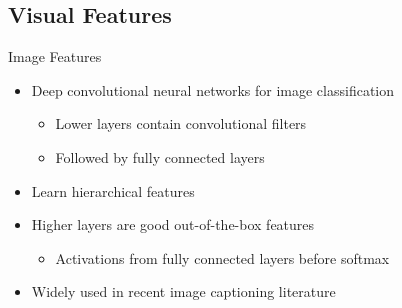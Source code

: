 \documentclass{beamer}
\begin{document}
\subsection{Visual Features}
\begin{frame}{Image Features}
\begin{itemize}
\item Deep convolutional neural networks for image classification 
    \begin{itemize}
        \item Lower layers contain convolutional filters 
        \item Followed by fully connected layers
    \end{itemize}
\item Learn hierarchical features
\item Higher layers are good out-of-the-box features  
    \begin{itemize}    
        \item Activations from fully connected layers before softmax 
    \end{itemize}
\item Widely used in recent image captioning literature~\cite{Vinyals_2015_CVPR,Fang2015} 
\end{itemize} 
\end{frame}
\end{document}
